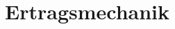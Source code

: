 \documentclass[11pt]{scrartcl}
\begin{document}
    

    

    \section{Ertragsmechanik}
    




\end{document}
